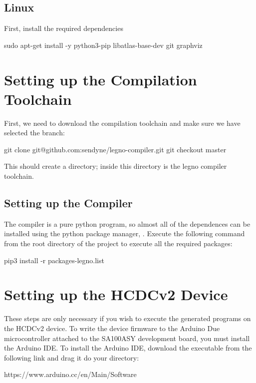 \subsection{Linux}

First, install the required dependencies

\begin{snippet}
sudo apt-get install -y python3-pip libatlas-base-dev git graphviz
\end{snippet}

\section{Setting up the Compilation Toolchain}


First, we need to download the compilation toolchain and make sure we have
selected the  branch:

\begin{snippet}
  git clone git@github.com:sendyne/legno-compiler.git
  git checkout master
\end{snippet}

This should create a  directory; inside this directory is the
legno compiler toolchain.

\subsection{Setting up the Compiler}
The compiler is a pure python program, so almost all of the dependences can be
installed using the python package manager, . Execute the following command
from the root directory of the  project to execute all the required packages:

\begin{snippet}
  pip3 install -r packages-legno.list
\end{snippet}

\section{Setting up the HCDCv2 Device}
These steps are only necessary if you wish to execute the generated programs on
the HCDCv2 device. To write the device firmware to the Arduino Due microcontroller attached
to the SA100ASY development board, you must install the Arduino IDE. To install
the Arduino IDE, download the executable from the following link and drag it do your  directory:

\begin{snippet}
https://www.arduino.cc/en/Main/Software
\end{snippet}

